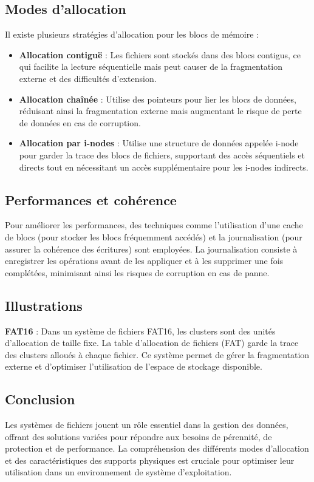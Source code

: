 \subsection{Modes d'allocation}
Il existe plusieurs stratégies d'allocation pour les blocs de mémoire :
\begin{itemize}
    \item \textbf{Allocation contiguë} : Les fichiers sont stockés dans des blocs contigus, ce qui facilite la lecture séquentielle mais peut causer de la fragmentation externe et des difficultés d'extension.
    \item \textbf{Allocation chaînée} : Utilise des pointeurs pour lier les blocs de données, réduisant ainsi la fragmentation externe mais augmentant le risque de perte de données en cas de corruption.
    \item \textbf{Allocation par i-nodes} : Utilise une structure de données appelée i-node pour garder la trace des blocs de fichiers, supportant des accès séquentiels et directs tout en nécessitant un accès supplémentaire pour les i-nodes indirects.
\end{itemize}

\subsection{Performances et cohérence}
Pour améliorer les performances, des techniques comme l'utilisation d'une cache de blocs (pour stocker les blocs fréquemment accédés) et la journalisation (pour assurer la cohérence des écritures) sont employées. 
La journalisation consiste à enregistrer les opérations avant de les appliquer et à les supprimer une fois complétées, minimisant ainsi les risques de corruption en cas de panne.

\subsection{Illustrations}
\textbf{FAT16} : Dans un système de fichiers FAT16, les clusters sont des unités d'allocation de taille fixe. 
La table d'allocation de fichiers (FAT) garde la trace des clusters alloués à chaque fichier. 
Ce système permet de gérer la fragmentation externe et d'optimiser l'utilisation de l'espace de stockage disponible.

\subsection{Conclusion}
Les systèmes de fichiers jouent un rôle essentiel dans la gestion des données, offrant des solutions variées pour répondre aux besoins de pérennité, de protection et de performance. 
La compréhension des différents modes d'allocation et des caractéristiques des supports physiques est cruciale pour optimiser leur utilisation dans un environnement de système d'exploitation.
